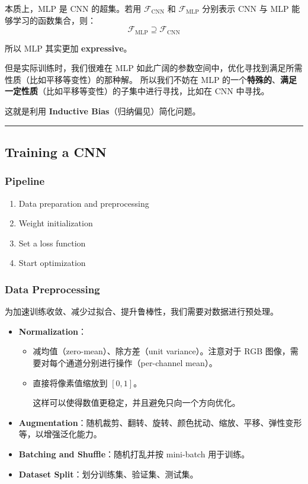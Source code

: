 本质上，MLP 是 CNN 的超集。若用 \(\mathcal{F}_{\text{CNN}}\) 和
\(\mathcal{F}_{\text{MLP}}\) 分别表示 CNN 与 MLP
能够学习的函数集合，则： \[
\mathcal{F}_{\text{MLP}} \supseteq \mathcal{F}_{\text{CNN}}
\]

所以 MLP 其实更加 \textbf{expressive}。

但是实际训练时，我们很难在 MLP
如此广阔的参数空间中，优化寻找到满足所需性质（比如平移等变性）的那种解。
所以我们不妨在 MLP
的一个\textbf{特殊的}、\textbf{满足一定性质}（比如平移等变性）的子集中进行寻找，比如在
CNN 中寻找。

这就是利用 \textbf{Inductive Bias}（归纳偏见）简化问题。

\begin{center}\rule{0.5\linewidth}{0.5pt}\end{center}

\subsection{Training a CNN}\label{training-a-cnn}

\subsubsection{Pipeline}\label{pipeline}

\begin{enumerate}
\def\labelenumi{\arabic{enumi}.}
\tightlist
\item
  Data preparation and preprocessing
\item
  Weight initialization
\item
  Set a loss function
\item
  Start optimization
\end{enumerate}

\subsubsection{Data Preprocessing}\label{data-preprocessing}

为加速训练收敛、减少过拟合、提升鲁棒性，我们需要对数据进行预处理。

\begin{itemize}
\item
  \textbf{Normalization}：

  \begin{itemize}
  \item
    减均值（zero-mean）、除方差（unit variance）。注意对于 RGB
    图像，需要对每个通道分别进行操作（per-channel mean）。
  \item
    直接将像素值缩放到 \([0,1]\)。

    这样可以使得数值更稳定，并且避免只向一个方向优化。
  \end{itemize}
\item
  \textbf{Augmentation}：随机裁剪、翻转、旋转、颜色扰动、缩放、平移、弹性变形等，以增强泛化能力。
\item
  \textbf{Batching and Shuffle}：随机打乱并按 mini-batch 用于训练。
\item
  \textbf{Dataset Split}：划分训练集、验证集、测试集。
\end{itemize}

